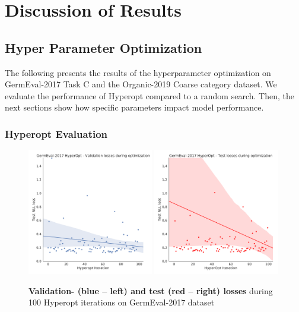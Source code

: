 \chapter{Discussion of Results}
\label{ch:discussion}

\section{Hyper Parameter Optimization}

The following presents the results of the hyperparameter optimization on GermEval-2017 Task C and the Organic-2019 Coarse category dataset. We evaluate the performance of Hyperopt compared to a random search. Then, the next sections show how specific parameters impact model performance. 

\subsection{Hyperopt Evaluation}

\begin{figure}[ht]
    \centering
    \includegraphics[width=0.49\textwidth]{figures/06_results/06_hp_ge_lm_loss-iteration_validation}
    \includegraphics[width=0.49\textwidth]{figures/06_results/06_hp_ge_lm_loss-iteration_test}
    \caption{\textbf{Validation- {(blue -- left)} and test {(red -- right)} losses} during 100 Hyperopt iterations on GermEval-2017 dataset}
    \label{fig:06_ValidationLossGermEvalHp}
\end{figure}

